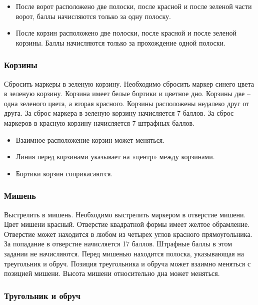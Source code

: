 \begin{itemize}
    \item После ворот расположено две полоски, после красной и после зеленой части ворот, баллы начисляются только за одну полоску.
    \item После корзин расположено две полоски, после красной и после зеленой корзины. Баллы начисляются только за прохождение одной полоски.
\end{itemize}

\subsubsection*{Корзины}


Сбросить маркеры в зеленую корзину. Необходимо сбросить маркер синего цвета в зеленую корзину. Корзина имеет белые бортики и цветное дно. Корзины две – одна зеленого цвета, а вторая красного. Корзины расположены недалеко друг от друга. За сброс маркера в зеленую корзину начисляется 7 баллов. За сброс маркеров в красную корзину начисляется 7 штрафных баллов.  

\begin{itemize}
    \item Взаимное расположение корзин может меняться.
    \item Линия перед корзинами указывает на «центр» между корзинами.
    \item Бортики корзин соприкасаются.
\end{itemize}

\subsubsection*{Мишень}


Выстрелить в мишень. Необходимо выстрелить маркером в отверстие мишени. Цвет мишени красный. Отверстие квадратной формы имеет желтое обрамление. Отверстие может находится в любом из четырех углов красного прямоугольника. За попадание в отверстие начисляется 17 баллов. Штрафные баллы в этом задании не начисляются. Перед мишенью находится полоска, указывающая на треугольник и обруч. Позиция  треугольника и обруча может взаимно меняться с позицией мишени. Высота  мишени относительно дна может меняться.

\subsubsection*{Тругольник и обруч}

